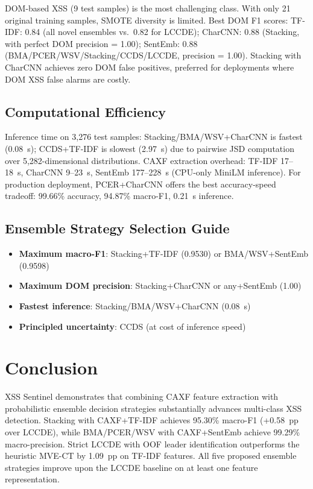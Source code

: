 \documentclass[conference]{IEEEtran}
\begin{document}
DOM-based XSS (9 test samples) is the most challenging class. With only
21 original training samples, SMOTE diversity is limited. Best DOM F1
scores: TF-IDF: 0.84 (all novel ensembles vs.\ 0.82 for LCCDE);
CharCNN: 0.88 (Stacking, with perfect DOM precision = 1.00);
SentEmb: 0.88 (BMA/PCER/WSV/Stacking/CCDS/LCCDE, precision = 1.00).
Stacking with CharCNN achieves zero DOM false positives, preferred for
deployments where DOM XSS false alarms are costly.

\subsection{Computational Efficiency}

Inference time on 3,276 test samples: Stacking/BMA/WSV+CharCNN is fastest
(0.08~s); CCDS+TF-IDF is slowest (2.97~s) due to pairwise JSD computation
over 5,282-dimensional distributions. CAXF extraction overhead: TF-IDF
17--18~s, CharCNN 9--23~s, SentEmb 177--228~s (CPU-only MiniLM inference).
For production deployment, PCER+CharCNN offers the best accuracy-speed
tradeoff: 99.66\% accuracy, 94.87\% macro-F1, 0.21~s inference.

\subsection{Ensemble Strategy Selection Guide}

\begin{itemize}
  \item \textbf{Maximum macro-F1}: Stacking+TF-IDF (0.9530) or BMA/WSV+SentEmb (0.9598)
  \item \textbf{Maximum DOM precision}: Stacking+CharCNN or any+SentEmb (1.00)
  \item \textbf{Fastest inference}: Stacking/BMA/WSV+CharCNN (0.08~s)
  \item \textbf{Principled uncertainty}: CCDS (at cost of inference speed)
\end{itemize}

\section{Conclusion}
\label{sec:conclusion}

XSS Sentinel demonstrates that combining CAXF feature extraction with
probabilistic ensemble decision strategies substantially advances multi-class
XSS detection. Stacking with CAXF+TF-IDF achieves 95.30\% macro-F1
(+0.58~pp over LCCDE), while BMA/PCER/WSV with CAXF+SentEmb achieve
99.29\% macro-precision. Strict LCCDE with OOF leader identification
outperforms the heuristic MVE-CT by 1.09~pp on TF-IDF features. All five
proposed ensemble strategies improve upon the LCCDE baseline on at least
one feature representation.
\end{document}
